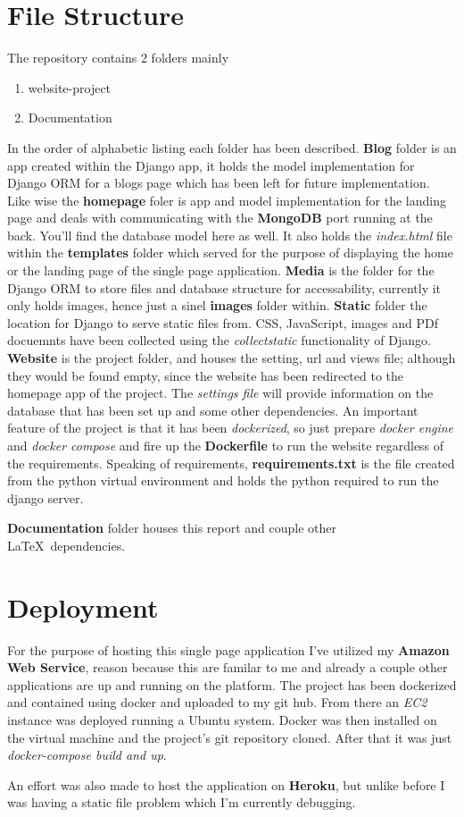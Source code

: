 \documentclass[11pt]{article}
\begin{document}
\section{File Structure}
The repository contains 2 folders mainly
\begin{enumerate}
	\item website-project
	\item Documentation
\end{enumerate}
In the order of alphabetic listing each folder has been described. 
\textbf{Blog} folder is an app created within the Django app, it holds the model implementation for Django ORM for a blogs page which has been left for future implementation. 
Like wise the \textbf{homepage} foler is app and model implementation for the landing page and deals with communicating with the \textbf{MongoDB} port running at the back. 
You'll find the database model here as well. 
It also holds the \textit{index.html} file within the \textbf{templates} folder which served for the purpose of displaying the home or the landing page of the single page application. 
\textbf{Media} is the folder for the Django ORM to store files and database structure for accessability, currently it only holds images, hence just a sinel \textbf{images} folder within. 
\textbf{Static} folder the location for Django to serve static files from. 
CSS, JavaScript, images and PDf docuemnts have been collected using the \textit{collectstatic} functionality of Django. 
\textbf{Website} is the project folder, and houses the setting, url and views file; although they would be found empty, since the website has been redirected to the homepage app of the project. 
The \textit{settings file} will provide information on the database that has been set up and some other dependencies. 
An important feature of the project is that it has been \textit{dockerized}, so just prepare \textit{docker engine} and \textit{docker compose} and fire up the \textbf{Dockerfile} to run the website regardless of the requirements. 
Speaking of requirements, \textbf{requirements.txt} is the file created from the python virtual environment and holds the python required to run the django server. \par
\textbf{Documentation} folder houses this report and couple other \LaTeX\ dependencies.

\section{Deployment}
For the purpose of hosting this single page application I've utilized my \textbf{Amazon Web Service}, reason because this are familar to me and already a couple other applications are up and running on the platform. 
The project has been dockerized and contained using docker and uploaded to my git hub. 
From there an \textit{EC2} instance was deployed running a Ubuntu system. 
Docker was then installed on the virtual machine and the project's git repository cloned. 
After that it was just \textit{docker-compose build and up}. \par
An effort was also made to host the application on \textbf{Heroku}, but unlike before I was having a static file problem which I'm currently debugging.
\end{document}
